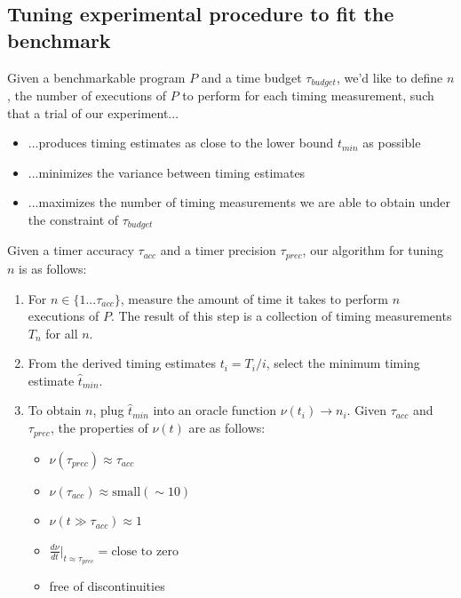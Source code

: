 \documentclass[conference]{IEEEtran}
\begin{document}
\label{sec:tuningprotocol}
\subsection{Tuning experimental procedure to fit the benchmark}

Given a benchmarkable program $P$ and a time budget $\tau_{budget}$, we'd like to define $n$, the number of executions of $P$ to perform for each timing measurement, such that a trial of our experiment...

\begin{itemize}
    \item ...produces timing estimates as close to the lower bound $t_{min}$ as possible
    \item ...minimizes the variance between timing estimates
    \item ...maximizes the number of timing measurements we are able to obtain under the constraint of $\tau_{budget}$
\end{itemize}

Given a timer accuracy $\tau_{acc}$ and a timer precision $\tau_{prec}$, our algorithm for tuning $n$ is as follows:

\begin{enumerate}
\item For $n \in \{1...\tau_{acc}\}$, measure the amount of time it takes to perform $n$ executions of $P$. The result of this step is a collection of timing measurements $T_n$ for all $n$.
\item From the derived timing estimates $t_i = T_i / i$, select the minimum timing estimate $\hat{t}_{min}$.
\item To obtain $n$, plug $\hat{t}_{min}$ into an oracle function $\nu(t_i) \to n_i$. Given $\tau_{acc}$ and $\tau_{prec}$, the properties of $\nu(t)$ are as follows:
\begin{itemize}
    \item $\nu(\tau_{prec}) \approx \tau_{acc}$
    \item $\nu(\tau_{acc}) \approx \text{small} (\sim 10)$
    \item $\nu(t \gg \tau_{acc}) \approx 1$
    \item $\frac{d\nu}{dt}\big|_{t \approx \tau_{prec}} = \text{close to zero}$
    \item free of discontinuities 
\end{itemize}
\end{enumerate}
\end{document}
